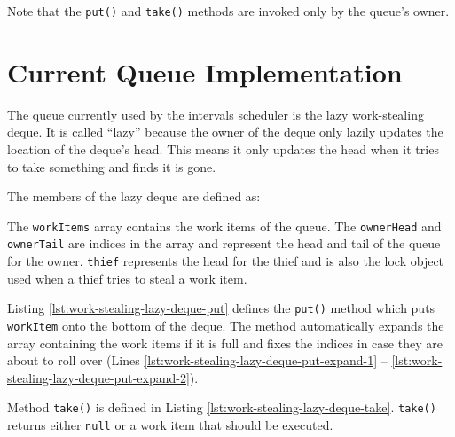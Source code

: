 

Note that the \lstinline!put()! and \lstinline!take()! methods are
invoked only by the queue's owner.


\section{Current Queue Implementation}
\label{sec:queues-background-current-implementation}


The queue currently used by the intervals scheduler is the lazy
work-stealing deque. It is called ``lazy'' because the owner of the
deque only lazily updates the location of the deque's head. This means
it only updates the head when it tries to take something and finds it
is gone.

The members of the lazy deque are defined as:



The \lstinline!workItems! array contains the work items of the
queue. The \lstinline!ownerHead! and \lstinline!ownerTail! are indices
in the array and represent the head and tail of the queue for the
owner. \lstinline!thief! represents the head for the thief and is also
the lock object used when a thief tries to steal a work item.

Listing \ref{lst:work-stealing-lazy-deque-put} defines the
\lstinline!put()! method which puts \lstinline!workItem! onto the
bottom of the deque. The method automatically expands the array
containing the work items if it is full and fixes the indices in case
they are about to roll over (Lines
\ref{lst:work-stealing-lazy-deque-put-expand-1} --
\ref{lst:work-stealing-lazy-deque-put-expand-2}).



Method \lstinline!take()! is defined in Listing
\ref{lst:work-stealing-lazy-deque-take}. \lstinline!take()! returns
either \lstinline!null! or a work item that should be executed.

